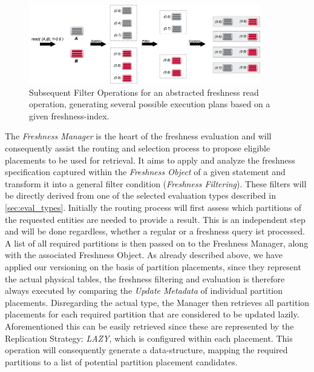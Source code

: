 \begin{figure}[t] 
    \centering 
    \includegraphics[width=0.9\textwidth]{Figures/filter.png}
    \caption{Subsequent Filter Operations for an abstracted freshness read operation, generating several possible execution plans based on a given freshness-index.}
    \label{fig:filter}
\end{figure}

The \emph{Freshness Manager} is the heart of the freshness evaluation and will consequently assist the routing and selection process to propose eligible placements
to be used for retrieval. 
It aims to apply and analyze the freshness specification captured within the \emph{Freshness Object} of a given statement and transform it 
into a general filter condition (\emph{Freshness Filtering}). These filters will be directly derived from one of the selected evaluation types described in \ref{sec:eval_types}.
Initially the routing process will first assess which partitions of the requested entities are needed to provide a result.
This is an independent step and will be done regardless, whether a regular or a freshness query ist processed. 
A list of all required partitions is then passed on to the Freshness Manager, along with the associated Freshness Object. 
As already described above, we have applied our versioning on the basis of partition placements, since they represent the actual physical tables,
the freshness filtering and evaluation is therefore always executed by comparing the \emph{Update Metadata} of individual partition placements. 
Disregarding the actual type, the Manager then retrieves all partition placements for each required partition that are considered to be updated lazily.
Aforementioned this can be easily retrieved since these are represented by the Replication Strategy: \emph{LAZY}, which is configured within each placement. 
This operation will consequently generate a data-structure, mapping the required partitions to a list of potential partition placement candidates.\\

